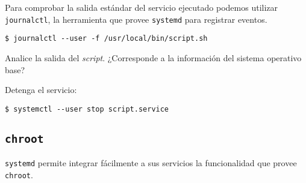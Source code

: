 \begin{questions}
  \question Para comprobar la salida estándar del servicio ejecutado
  podemos utilizar \texttt{journalctl}, la herramienta que provee
  \texttt{systemd} para registrar eventos.
\begin{verbatim}
$ journalctl --user -f /usr/local/bin/script.sh
\end{verbatim}

    Analice la salida del \textit{script}. ¿Corresponde a la información
    del sistema operativo base?

    \question Detenga el servicio:
\begin{verbatim}
$ systemctl --user stop script.service
\end{verbatim}
    

\end{questions}

\subsection{\texttt{chroot}}
\texttt{systemd} permite integrar fácilmente a sus servicios la
funcionalidad que provee \texttt{chroot}.

